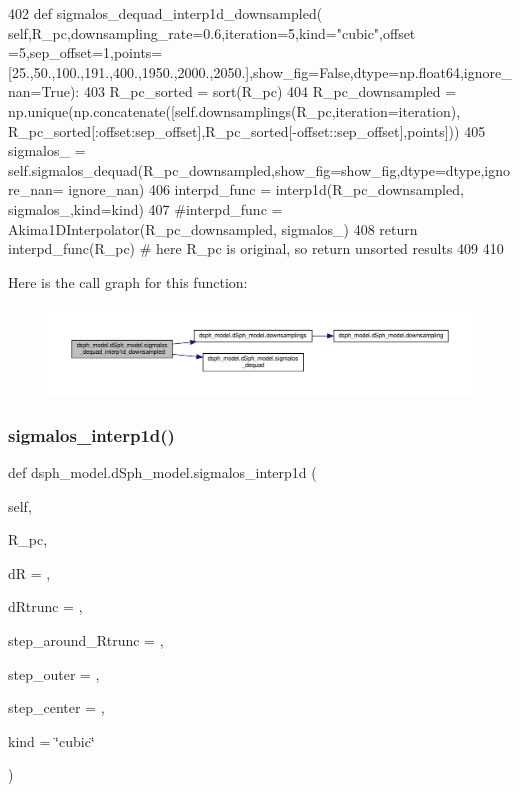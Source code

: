 \begin{DoxyCode}
402     \textcolor{keyword}{def }sigmalos\_dequad\_interp1d\_downsampled(
      self,R\_pc,downsampling\_rate=0.6,iteration=5,kind="cubic",offset
      =5,sep\_offset=1,points=[25.,50.,100.,191.,400.,1950.,2000.,2050.],show\_fig=False,dtype=np.float64,ignore\_nan=True):
403         R\_pc\_sorted = sort(R\_pc)
404         R\_pc\_downsampled = np.unique(np.concatenate([self.downsamplings(R\_pc,iteration=iteration),
      R\_pc\_sorted[:offset:sep\_offset],R\_pc\_sorted[-offset::sep\_offset],points]))
405         sigmalos\_ = self.sigmalos\_dequad(R\_pc\_downsampled,show\_fig=show\_fig,dtype=dtype,ignore\_nan=
      ignore\_nan)
406         interpd\_func = interp1d(R\_pc\_downsampled, sigmalos\_,kind=kind)
407         \textcolor{comment}{#interpd\_func = Akima1DInterpolator(R\_pc\_downsampled, sigmalos\_)}
408         \textcolor{keywordflow}{return} interpd\_func(R\_pc) \textcolor{comment}{# here R\_pc is original, so return unsorted results}
409         
410     
\end{DoxyCode}
Here is the call graph for this function\+:
\nopagebreak
\begin{figure}[H]
\begin{center}
\leavevmode
\includegraphics[width=350pt]{d0/d25/classdsph__model_1_1dSph__model_a0046cd7677792835d8cfafe83dbe276c_cgraph}
\end{center}
\end{figure}
\mbox{\label{classdsph__model_1_1dSph__model_ad105b90e1827d25804eb3d7a3ba96f28}} 
\subsubsection{\texorpdfstring{sigmalos\+\_\+interp1d()}{sigmalos\_interp1d()}}
{\footnotesize\ttfamily def dsph\+\_\+model.\+d\+Sph\+\_\+model.\+sigmalos\+\_\+interp1d (\begin{DoxyParamCaption}\item[{}]{self,  }\item[{}]{R\+\_\+pc,  }\item[{}]{dR = {},  }\item[{}]{d\+Rtrunc = {},  }\item[{}]{step\+\_\+around\+\_\+\+Rtrunc = {},  }\item[{}]{step\+\_\+outer = {},  }\item[{}]{step\+\_\+center = {},  }\item[{}]{kind = {\ttfamily \char`\"{}cubic\char`\"{}} }\end{DoxyParamCaption})}

